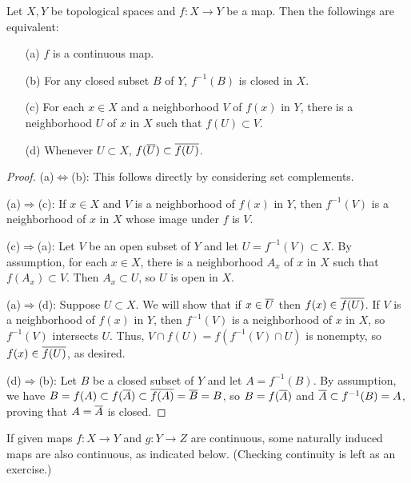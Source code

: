\begin{thm}
    Let $X, Y$ be topological spaces and $f: X\rightarrow Y$ be a map.
    Then the followings are equivalent:
    \begin{enumerate}
        \item[(a)]
        {
            $f$ is a continuous map.
        }
        \item[(b)]
        {
            For any closed subset $B$ of $Y$, $f^{-1}(B)$ is closed in $X$.
        }
        \item[(c)]
        {
            For each $x\in X$ and a neighborhood $V$ of $f(x)$ in $Y$, there is a neighborhood $U$ of $x$ in $X$ such that $f(U)\subset V$.
        }
        \item[(d)]
        {
            Whenever $U\subset X$, $f(\overline{U})\subset\overline{f(U)}$.
        }
    \end{enumerate}
\end{thm}
\begin{proof}
    (a)$\Leftrightarrow$(b):
        This follows directly by considering set complements.

    (a)$\Rightarrow$(c):
        If $x\in X$ and $V$ is a neighborhood of $f(x)$ in $Y$, then $f^{-1}(V)$ is a neighborhood of $x$ in $X$ whose image under $f$ is $V$.
    
    (c)$\Rightarrow$(a):
        Let $V$ be an open subset of $Y$ and let $U=f^{-1}(V)\subset X$.
        By assumption, for each $x\in X$, there is a neighborhood $A_x$ of $x$ in $X$ such that $f(A_x)\subset V$.
        Then $A_x\subset U$, so $U$ is open in $X$.
    
    (a)$\Rightarrow$(d):
        Suppose $U\subset X$.
        We will show that if $x\in\overline{U}$ then $f(x)\in\overline{f(U)}$.
        If $V$ is a neighborhood of $f(x)$ in $Y$, then $f^{-1}(V)$ is a neighborhood of $x$ in $X$, so $f^{-1}(V)$ intersects $U$.
        Thus, $V\cap f(U)=f(f^{-1}(V)\cap U)$ is nonempty, so $f(x)\in\overline{f(U)}$, as desired.

    (d)$\Rightarrow$(b):
        Let $B$ be a closed subset of $Y$ and let $A=f^{-1}(B)$.
        By assumption, we have $B=f(A)\subset f(\overline{A})\subset \overline{f(A)}=\overline{B}=B$, so $B=f(\overline{A})$ and $\overline{A}\subset f^{-1}(B)=A$, proving that $A=\overline{A}$ is closed.
\end{proof}

If given maps $f: X\rightarrow Y$ and $g: Y\rightarrow Z$ are continuous, some naturally induced maps are also continuous, as indicated below. \color{brown}(Checking continuity is left as an exercise.)\color{black}

